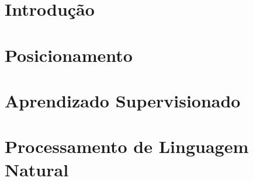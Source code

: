 \documentclass[a4paper,12pt,oneside,openany]{book}
\begin{document}
\frontmatter
\thispagestyle{empty}



\pagebreak



\tableofcontents
\listoffigures
\listoftables

\mainmatter
\cleardoublepage
\chapter{Introdução}
\label{introducao}


\chapter{Posicionamento}
\label{posicao}


\chapter{Aprendizado Supervisionado}
\label{supervisionado}


\chapter{Processamento de Linguagem Natural}
\label{nlp}

\end{document}

